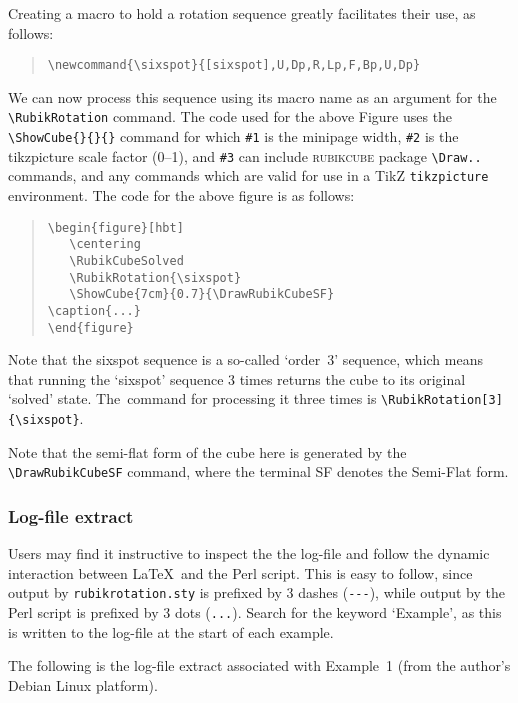 \documentclass[a4paper]{article}
\begin{document}
{\noindent}Creating a macro to hold  a rotation sequence greatly facilitates 
their use, as follows:
\begin{quote}
\begin{verbatim}
\newcommand{\sixspot}{[sixspot],U,Dp,R,Lp,F,Bp,U,Dp}
\end{verbatim}
\end{quote}
We can now process this sequence  using its macro name as an argument for the 
\verb!\RubikRotation! command. The code used for the above Figure  uses the 
\verb!\ShowCube{}{}{}! command for which \verb!#1! is the minipage width, \verb!#2! 
is the tikzpicture scale factor (0--1), and \verb!#3!  can include  \textsc{rubikcube}
package  \verb!\Draw..! commands,  and any commands which are valid for use in a 
TikZ \texttt{tikzpicture} environment. The code for the above figure is as follows:
\begin{quote}
\begin{verbatim}
\begin{figure}[hbt]
   \centering
   \RubikCubeSolved
   \RubikRotation{\sixspot}
   \ShowCube{7cm}{0.7}{\DrawRubikCubeSF}
\caption{...}
\end{figure}
\end{verbatim}
\end{quote}

Note that the sixspot sequence is a so-called `order~3' sequence, which means that 
running the `sixspot' sequence 3 times returns the cube to its original `solved' 
state. The~command for processing it three times is  \verb!\RubikRotation[3]{\sixspot}!.

Note that the semi-flat form of the cube here is generated by the
 \verb!\DrawRubikCubeSF! command, where the terminal SF denotes the Semi-Flat form.



\subsubsection{Log-file extract}

Users may find it instructive to inspect the the log-file and follow the dynamic 
interaction between \LaTeX\  and the Perl script. 
This is easy to follow, since output by \texttt{rubikrotation.sty} is prefixed 
by 3 dashes (\verb!---!), while output by the Perl script is prefixed by 
3 dots (\verb!...!). Search for the keyword `Example', as this is written to 
the log-file at the start of each example. 

The following is the log-file extract associated with Example~1 (from the 
author's Debian Linux platform).
\end{document}

